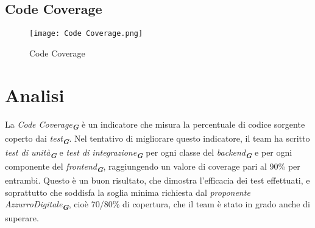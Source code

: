\newpage

\subsection{Code Coverage}
\label{subsec:Code Coverage}

\begin{figure}[h] 
    \centering
    \texttt{[image: Code Coverage.png]}
    \caption{Code Coverage} 
    \label{fig: Code Coverage}
\end{figure}

\section*{Analisi}
La \emph{Code Coverage}\textsubscript{\textbf{\textit{G}}} è un indicatore che misura la percentuale di codice sorgente coperto dai \emph{test}\textsubscript{\textbf{\textit{G}}}. Nel tentativo di migliorare questo indicatore, il team ha scritto \emph{test di unità}\textsubscript{\textbf{\textit{G}}} e \emph{test di integrazione}\textsubscript{\textbf{\textit{G}}} per ogni classe del \emph{backend}\textsubscript{\textbf{\textit{G}}} e per ogni componente del \emph{frontend}\textsubscript{\textbf{\textit{G}}}, raggiungendo un valore di coverage pari al 90\% per entrambi. Questo è un buon risultato, che dimostra l'efficacia dei test effettuati, e soprattutto che soddisfa la soglia minima richiesta dal \emph{proponente} \emph{AzzurroDigitale}\textsubscript{\textbf{\textit{G}}}, cioè 70/80\% di copertura, che il team è stato in grado anche di superare.
